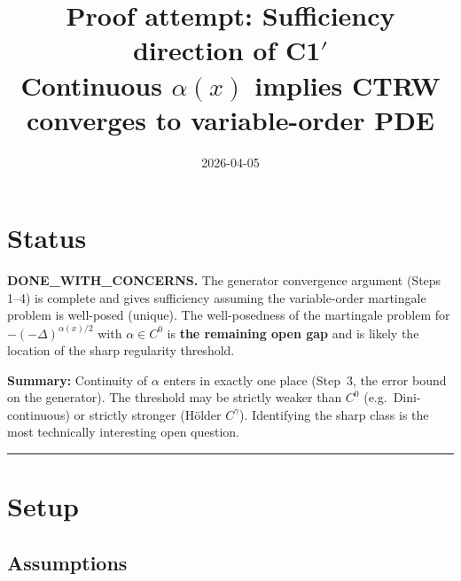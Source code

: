 \documentclass{amsart}
\title{Proof attempt: Sufficiency direction of C1$'$ \\
{\normalsize Continuous $\alpha(x)$ implies CTRW converges to variable-order PDE}}
\date{2026-04-05}
\theoremstyle{definition}
\begin{document}
\maketitle

\section*{Status}
\textbf{DONE\_WITH\_CONCERNS.}
The generator convergence argument (Steps 1--4) is complete and gives sufficiency
assuming the variable-order martingale problem is well-posed (unique).
The well-posedness of the martingale problem for $-(-\Delta)^{\alpha(x)/2}$ with
$\alpha \in C^0$ is \textbf{the remaining open gap} and is likely the location of
the sharp regularity threshold.

\bigskip
\textbf{Summary:} Continuity of $\alpha$ enters in exactly one place (Step~3,
the error bound on the generator). The threshold may be strictly weaker than $C^0$
(e.g.\ Dini-continuous) or strictly stronger (Hölder $C^\gamma$). Identifying the
sharp class is the most technically interesting open question.

\bigskip\hrule\bigskip

\section{Setup}

\subsection{Assumptions}
\end{document}
